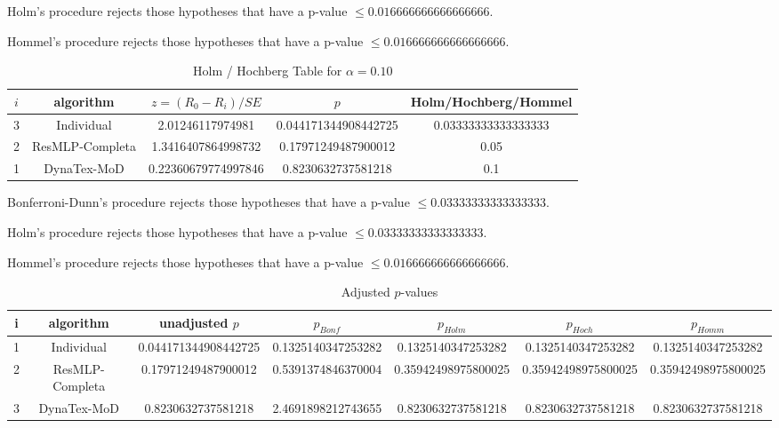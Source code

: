 \documentclass[a4paper,10pt]{article}
\begin{document}
\begin{landscape}
Holm's procedure rejects those hypotheses that have a p-value $\le0.016666666666666666$.


Hommel's procedure rejects those hypotheses that have a p-value $\le0.016666666666666666$.


\begin{table}[!htp]
\centering\tiny
\caption{Holm / Hochberg Table for $\alpha=0.10$}
\begin{tabular}{ccccc}
$i$&algorithm&$z=(R_0 - R_i)/SE$&$p$&Holm/Hochberg/Hommel\\
\hline
3&Individual&2.01246117974981&0.044171344908442725&0.03333333333333333\\
2&ResMLP-Completa&1.3416407864998732&0.17971249487900012&0.05\\
1&DynaTex-MoD&0.22360679774997846&0.8230632737581218&0.1\\
\hline
\end{tabular}
\end{table}
Bonferroni-Dunn's procedure rejects those hypotheses that have a p-value $\le0.03333333333333333$.


Holm's procedure rejects those hypotheses that have a p-value $\le0.03333333333333333$.


Hommel's procedure rejects those hypotheses that have a p-value $\le0.016666666666666666$.


\begin{table}[!htp]
\centering\tiny
\caption{Adjusted $p$-values}
\begin{tabular}{ccccccc}
i&algorithm&unadjusted $p$&$p_{Bonf}$&$p_{Holm}$&$p_{Hoch}$&$p_{Homm}$\\
\hline
1&Individual&0.044171344908442725&0.1325140347253282&0.1325140347253282&0.1325140347253282&0.1325140347253282\\
2&ResMLP-Completa&0.17971249487900012&0.5391374846370004&0.35942498975800025&0.35942498975800025&0.35942498975800025\\
3&DynaTex-MoD&0.8230632737581218&2.4691898212743655&0.8230632737581218&0.8230632737581218&0.8230632737581218\\
\hline
\end{tabular}
\end{table}


\end{landscape}
\end{document}

